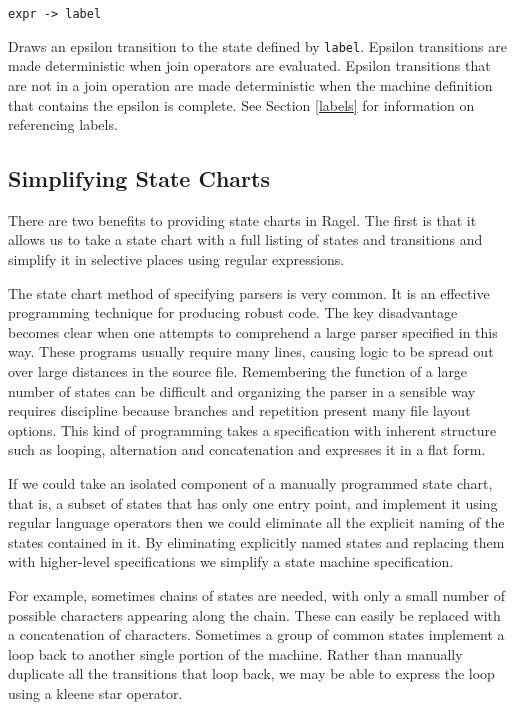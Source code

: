 \documentclass[letterpaper,11pt,oneside]{book}
\begin{document}
\verb|expr -> label| 

Draws an epsilon transition to the state defined
by \verb|label|.  Epsilon transitions are made deterministic when join
operators are evaluated. Epsilon transitions that are not in a join operation
are made deterministic when the machine definition that contains the epsilon is
complete. See Section \ref{labels} for information on referencing labels.

\subsection{Simplifying State Charts}

There are two benefits to providing state charts in Ragel. The first is that it
allows us to take a state chart with a full listing of states and transitions
and simplify it in selective places using regular expressions.

The state chart method of specifying parsers is very common.  It is an
effective programming technique for producing robust code. The key disadvantage
becomes clear when one attempts to comprehend a large parser specified in this
way.  These programs usually require many lines, causing logic to be spread out
over large distances in the source file. Remembering the function of a large
number of states can be difficult and organizing the parser in a sensible way
requires discipline because branches and repetition present many file layout
options.  This kind of programming takes a specification with inherent
structure such as looping, alternation and concatenation and expresses it in a
flat form. 

If we could take an isolated component of a manually programmed state chart,
that is, a subset of states that has only one entry point, and implement it
using regular language operators then we could eliminate all the explicit
naming of the states contained in it. By eliminating explicitly named states
and replacing them with higher-level specifications we simplify a state machine
specification.

For example, sometimes chains of states are needed, with only a small number of
possible characters appearing along the chain. These can easily be replaced
with a concatenation of characters. Sometimes a group of common states
implement a loop back to another single portion of the machine. Rather than
manually duplicate all the transitions that loop back, we may be able to
express the loop using a kleene star operator.
\end{document}
